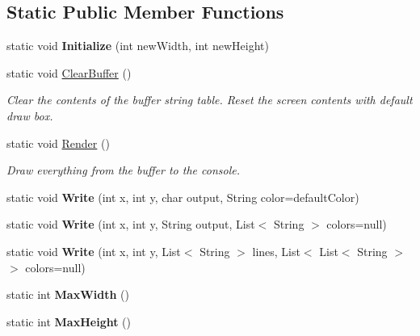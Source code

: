 \subsection*{Static Public Member Functions}
\begin{DoxyCompactItemize}
\item 
\mbox{\label{class_i_o_1_1_console_u_i_a3969348ad591fb8bd0b0a5ac9cb08a9e}} 
static void {\bfseries Initialize} (int new\+Width, int new\+Height)
\item 
static void \mbox{\hyperlink{class_i_o_1_1_console_u_i_a7b605726f9cc6c04e7656ffe1efa50f0}{Clear\+Buffer}} ()
\begin{DoxyCompactList}\small\item\em Clear the contents of the buffer string table. Reset the screen contents with default draw box. \end{DoxyCompactList}\item 
static void \mbox{\hyperlink{class_i_o_1_1_console_u_i_a8fe3234db68da3a6b652446f317f92cd}{Render}} ()
\begin{DoxyCompactList}\small\item\em Draw everything from the buffer to the console. \end{DoxyCompactList}\item 
\mbox{\label{class_i_o_1_1_console_u_i_ae6befc1153f02e49bc37b80279b5ca24}} 
static void {\bfseries Write} (int x, int y, char output, String color=default\+Color)
\item 
\mbox{\label{class_i_o_1_1_console_u_i_a9a5389eab5915fefa39f0113bbdb22ee}} 
static void {\bfseries Write} (int x, int y, String output, List$<$ String $>$ colors=null)
\item 
\mbox{\label{class_i_o_1_1_console_u_i_a5a140bb45584b0876d4cd05af1f029f2}} 
static void {\bfseries Write} (int x, int y, List$<$ String $>$ lines, List$<$ List$<$ String $>$$>$ colors=null)
\item 
\mbox{\label{class_i_o_1_1_console_u_i_acc2e309427aa386d947d0f22f3ee3b4a}} 
static int {\bfseries Max\+Width} ()
\item 
\mbox{\label{class_i_o_1_1_console_u_i_a23b24ed44e1b7d603706af686f04c81e}} 
static int {\bfseries Max\+Height} ()
\end{DoxyCompactItemize}


